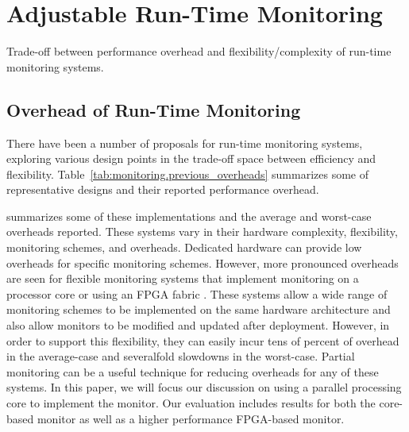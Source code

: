 \section{Adjustable Run-Time Monitoring}
\label{sec:monitoring}

\begin{table*}[t]
  \begin{center}
    \vspace{-0.0in}
    \begin{footnotesize}
    
    \end{footnotesize}
    \caption{Trade-off between performance overhead and flexibility/complexity of run-time monitoring systems.}
    \vspace{-0.2in}
    \label{tab:monitoring.previous_overheads}
  \end{center}
\end{table*}

\subsection{Overhead of Run-Time Monitoring}

There have been a number of proposals for run-time monitoring systems, exploring various
design points in the trade-off space between efficiency and flexibility.
Table~\ref{tab:monitoring.previous_overheads} summarizes some of representative designs
and their reported performance overhead.

summarizes some of these implementations and the average and worst-case
overheads reported. These systems vary in their hardware complexity,
flexibility, monitoring schemes, and overheads. Dedicated hardware can provide low 
overheads for specific monitoring schemes. However, more pronounced overheads are seen for 
flexible monitoring systems that implement monitoring on a processor core
\cite{lba-asid06, lba-isca08, nagarajan-interact08} or using an FPGA fabric
\cite{flexcore-micro10}. These systems allow a wide range of monitoring schemes to
be implemented on the same hardware architecture and also allow monitors to be modified and updated after deployment. However, in order to support this flexibility, they can easily incur tens of percent of
overhead in the average-case and severalfold slowdowns in the worst-case. Partial monitoring
can be a useful technique for reducing overheads for any of these systems.
In this paper, we will focus our discussion on using a parallel
processing core to implement the monitor. Our evaluation includes results
for both the core-based monitor as well as a higher performance FPGA-based monitor.

